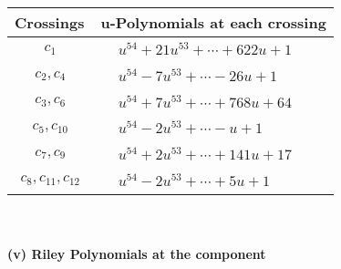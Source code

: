 \documentclass[1p]{elsarticle_modified}
\theoremstyle{definition}
\begin{document}
\begin{tabular}{m{50pt}|m{274pt}}
Crossings & \hspace{64pt}u-Polynomials at each crossing \\
\hline $$\begin{aligned}c_{1}\end{aligned}$$&$\begin{aligned}
&u^{54}+21 u^{53}+\cdots+622 u+1
\end{aligned}$\\
\hline $$\begin{aligned}c_{2},c_{4}\end{aligned}$$&$\begin{aligned}
&u^{54}-7 u^{53}+\cdots-26 u+1
\end{aligned}$\\
\hline $$\begin{aligned}c_{3},c_{6}\end{aligned}$$&$\begin{aligned}
&u^{54}+7 u^{53}+\cdots+768 u+64
\end{aligned}$\\
\hline $$\begin{aligned}c_{5},c_{10}\end{aligned}$$&$\begin{aligned}
&u^{54}-2 u^{53}+\cdots- u+1
\end{aligned}$\\
\hline $$\begin{aligned}c_{7},c_{9}\end{aligned}$$&$\begin{aligned}
&u^{54}+2 u^{53}+\cdots+141 u+17
\end{aligned}$\\
\hline $$\begin{aligned}c_{8},c_{11},c_{12}\end{aligned}$$&$\begin{aligned}
&u^{54}-2 u^{53}+\cdots+5 u+1
\end{aligned}$\\
\hline
\end{tabular}\\~\\
\newpage\renewcommand{\arraystretch}{1}
\flushleft \textbf{(v) Riley Polynomials at the component}\newline \\
\end{document}
